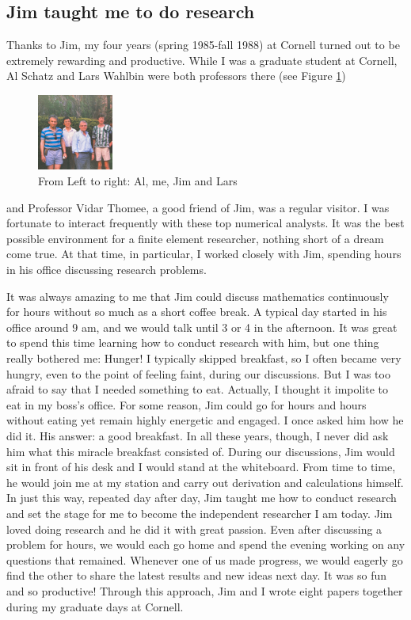 \documentclass[CJK,11pt]{amsart}
\theoremstyle{definition}
\begin{document}
\begin{CJK*}{UTF8}{gbsn}
\section{Jim taught me to do research}
Thanks to Jim, my four years (spring 1985-fall 1988) at Cornell turned out to be extremely rewarding and productive. While I was a graduate student at Cornell, Al Schatz and Lars Wahlbin were both professors there (see Figure \ref{Fig1})
\begin{figure}[h]
 \includegraphics[height=2.5cm]{BrambleSchatzWahlbinXu.jpg}
 \caption{\tiny From Left to right: Al, me, Jim and Lars}
 \label{Fig1}
\end{figure}
and Professor Vidar Thomee, a good friend of Jim, was a regular visitor. I was fortunate to interact frequently with these top numerical analysts. It was the best possible environment for a finite element researcher, nothing short of a dream come true. At that time, in particular, I worked closely with Jim, spending hours in his office discussing research problems. 

It was always amazing to me that Jim could discuss mathematics continuously for hours without so much as a short coffee break. A typical day started in his office around $9$ am, and we would talk until 3 or 4 in the afternoon. It was great to spend this time learning how to conduct research with him, but one thing really bothered me: Hunger! I typically skipped breakfast, so I often became very hungry, even to the point of feeling faint, during our discussions. But I was too afraid to say that I needed something to eat. Actually, I thought it impolite to eat in my boss's office. For some reason, Jim could go for hours and hours without eating yet remain highly energetic and engaged. I once asked him how he did it. His answer: a good breakfast. In all these years, though, I never did ask him what this miracle breakfast consisted of.
During our discussions, Jim would sit in front of his desk and I would stand at the whiteboard. From time to time, he would join me at my station and carry out derivation and calculations himself. In just this way, repeated day after day, Jim taught me how to conduct research and set the stage for me to become the independent researcher I am today. Jim loved doing research and he did it with great passion. Even after discussing a problem for hours, we would each go home and spend the evening working on any questions that remained. Whenever one of us made progress, we would eagerly go find the other to share the latest results and new ideas next day. It was so fun and so productive! Through this approach, Jim and I wrote eight papers together during my graduate days at Cornell.


\end{CJK*}
\end{document}
